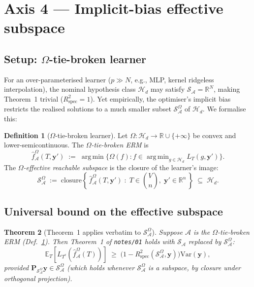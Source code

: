 \documentclass[11pt,a4paper]{article}
\theoremstyle{plain}
\newtheorem{theorem}{Theorem}
\theoremstyle{definition}
\newtheorem{definition}[theorem]{Definition}
\theoremstyle{remark}
\newcommand{\by}{\mathbf{y}}
\newcommand{\bP}{\mathbf{P}}
\newcommand{\E}{\mathbb{E}}
\newcommand{\R}{\mathbb{R}}
\newcommand{\Var}{\mathrm{Var}}
\newcommand{\Rspec}{R^2_{\mathrm{spec}}}
\newcommand{\Scal}{\mathcal{S}}
\newcommand{\Acal}{\mathcal{A}}
\newcommand{\Hcal}{\mathcal{H}}
\DeclareMathOperator*{\argmin}{arg\,min}
\begin{document}
\section{Axis 4 --- Implicit-bias effective subspace}
\label{sec:axis-4}

\subsection{Setup: $\Omega$-tie-broken learner}

For an over-parameterised learner ($p \gg N$, e.g., MLP, kernel
ridgeless interpolation), the nominal hypothesis class $\Hcal_d$ may
satisfy $\Scal_\Acal = \R^N$, making Theorem~1 trivial
($\Rspec = 1$). Yet empirically, the optimiser's implicit bias
restricts the realised solutions to a much smaller subset
$\Scal_\Acal^\Omega$ of $\Hcal_d$. We formalise this:

\begin{definition}[$\Omega$-tie-broken learner]
\label{def:omega-learner}
Let $\Omega : \Hcal_d \to \R \cup \{+\infty\}$ be convex and
lower-semicontinuous. The \emph{$\Omega$-tie-broken ERM} is
\begin{equation}
    \hat f_\Acal^\Omega(T, \by') \;:=\;
    \argmin\!\big\{\Omega(f) : f \in \argmin_{g \in \Hcal_d} L_T(g, \by')\big\}.
    \label{eq:omega-learner}
\end{equation}
The \emph{$\Omega$-effective reachable subspace} is the closure of
the learner's image:
\begin{equation}
    \Scal_\Acal^\Omega \;:=\; \mathrm{closure}\!\left\{\,
        \hat f_\Acal^\Omega(T, \by') \;:\; T \in \binom{V}{n},\;
        \by' \in \R^n\,\right\} \;\subseteq\; \Hcal_d.
    \label{eq:s-omega}
\end{equation}
\end{definition}

\subsection{Universal bound on the effective subspace}

\begin{theorem}[Theorem~1 applies verbatim to $\Scal_\Acal^\Omega$]
\label{thm:axis-4}
Suppose $\Acal$ is the $\Omega$-tie-broken ERM
(Def.~\ref{def:omega-learner}). Then Theorem~1 of \texttt{notes/01}
holds with $\Scal_\Acal$ replaced by $\Scal_\Acal^\Omega$:
\begin{equation}
    \E_T\!\left[L_{T^c}(\hat f_\Acal^\Omega(T))\right]
    \;\ge\; \big(1 - \Rspec(\Scal_\Acal^\Omega, \by)\big)\Var(\by),
    \label{eq:axis-4-main}
\end{equation}
provided $\bP_{\Scal_\Acal^\Omega}\by \in \Scal_\Acal^\Omega$
(which holds whenever $\Scal_\Acal^\Omega$ is a subspace, by
closure under orthogonal projection).
\end{theorem}
\end{document}
